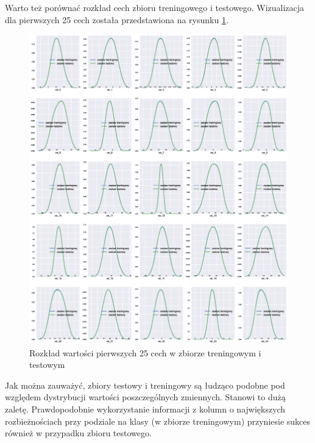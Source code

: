 ﻿\documentclass[12pt]{article}
\begin{document}
Warto też porównać rozkład cech zbioru treningowego i testowego. Wizualizacja dla pierwszych 25 cech została przedstawiona na rysunku \ref{features_distribution_train_vs_test}.

\begin{figure}[H]
\centering 
\includegraphics[width = 472pt]{feature_distribution_train_vs_test.eps}
\caption{Rozkład wartości pierwszych 25 cech w zbiorze treningowym i testowym}
\label{features_distribution_train_vs_test}
\end{figure}

Jak można zauważyć, zbiory testowy i treningowy są łudząco podobne pod względem dystrybucji wartości poszczególnych zmiennych. Stanowi to dużą zaletę. Prawdopodobnie wykorzystanie informacji z kolumn o największych rozbieżnościach przy podziale na klasy (w zbiorze treningowym) przyniesie sukces również w przypadku zbioru testowego.
\end{document}
